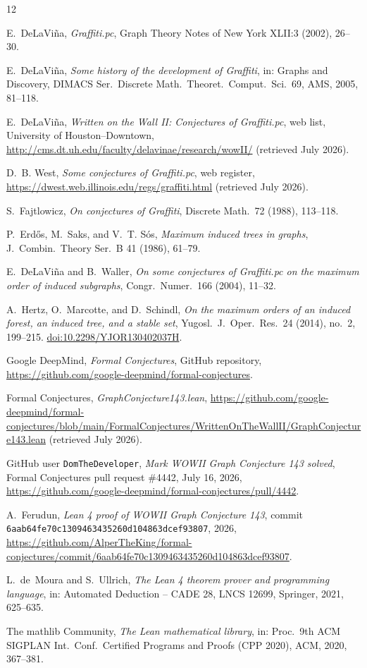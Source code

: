 \documentclass[11pt]{article}
\numberwithin{equation}{section}
\theoremstyle{remark}
\begin{document}
\begin{thebibliography}{12}

E.~DeLaVi\~na,
\emph{Graffiti.pc},
Graph Theory Notes of New York XLII:3 (2002), 26--30.

E.~DeLaVi\~na,
\emph{Some history of the development of Graffiti},
in: Graphs and Discovery, DIMACS Ser.\ Discrete Math.\ Theoret.\ Comput.\
Sci.\ 69, AMS, 2005, 81--118.

E.~DeLaVi\~na,
\emph{Written on the Wall II: Conjectures of Graffiti.pc},
web list, University of Houston--Downtown,
\url{http://cms.dt.uh.edu/faculty/delavinae/research/wowII/} (retrieved July
2026).

D.~B. West,
\emph{Some conjectures of Graffiti.pc},
web register,
\url{https://dwest.web.illinois.edu/regs/graffiti.html} (retrieved July
2026).

S.~Fajtlowicz,
\emph{On conjectures of Graffiti},
Discrete Math.\ 72 (1988), 113--118.

P.~Erd\H{o}s, M.~Saks, and V.~T. S\'os,
\emph{Maximum induced trees in graphs},
J.~Combin.\ Theory Ser.\ B 41 (1986), 61--79.

E.~DeLaVi\~na and B.~Waller,
\emph{On some conjectures of Graffiti.pc on the maximum order of induced
subgraphs},
Congr.\ Numer.\ 166 (2004), 11--32.

A.~Hertz, O.~Marcotte, and D.~Schindl,
\emph{On the maximum orders of an induced forest, an induced tree, and a
stable set},
Yugosl.\ J.\ Oper.\ Res.\ 24 (2014), no.~2, 199--215.
\href{https://doi.org/10.2298/YJOR130402037H}{doi:10.2298/YJOR130402037H}.

Google DeepMind,
\emph{Formal Conjectures},
GitHub repository,
\url{https://github.com/google-deepmind/formal-conjectures}.

Formal Conjectures,
\emph{GraphConjecture143.lean},
\url{https://github.com/google-deepmind/formal-conjectures/blob/main/FormalConjectures/WrittenOnTheWallII/GraphConjecture143.lean}
(retrieved July 2026).

GitHub user \texttt{DomTheDeveloper},
\emph{Mark WOWII Graph Conjecture 143 solved},
Formal Conjectures pull request \#4442, July 16, 2026,
\url{https://github.com/google-deepmind/formal-conjectures/pull/4442}.

A.~Ferudun,
\emph{Lean 4 proof of WOWII Graph Conjecture 143},
commit \texttt{6aab64fe70c1309463435260d104863dcef93807}, 2026,
\url{https://github.com/AlperTheKing/formal-conjectures/commit/6aab64fe70c1309463435260d104863dcef93807}.


L.~de~Moura and S.~Ullrich,
\emph{The Lean 4 theorem prover and programming language},
in: Automated Deduction -- CADE 28, LNCS 12699, Springer, 2021, 625--635.

The mathlib Community,
\emph{The Lean mathematical library},
in: Proc.\ 9th ACM SIGPLAN Int.\ Conf.\ Certified Programs and Proofs
(CPP 2020), ACM, 2020, 367--381.

\end{thebibliography}
\end{document}
